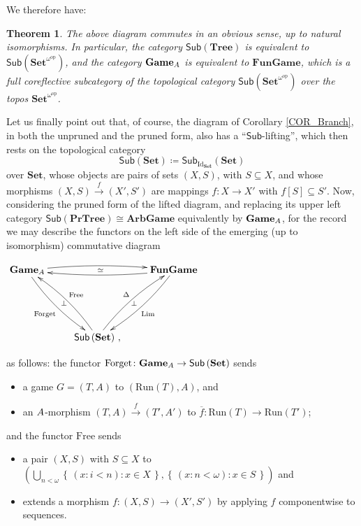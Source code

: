 \documentclass[12pt]{amsart}
\newtheorem{thm}{Theorem}[section]
\theoremstyle{definition}
\newcommand{\set}[1]{\left\{\, {#1} \,\right\}}
\newcommand{\seq}[1]{{\left( {#1} \right)}}
\newcommand{\A}{\textup{\textmd{\textsc{A}}}}
\newcommand{\Run}{{\mathrm{Run}}}
\newcommand{\Sets}{\mathbf{Set}}
\newcommand{\Tree}{\mathbf{Tree}}
\newcommand{\PrTree}{\mathbf{PrTree}}
\newcommand{\Games}{\mathbf{Game}}
\newcommand{\FunGame}{\mathbf{FunGame}}
\newcommand{\SetNop}{\Sets^{\omega^{\op}}}
\newcommand{\Sub}[1]{\mathsf{Sub}\left({#1}\right)}
\newcommand{\op}{\mathrm{op}}
\begin{document}
We therefore have:

\begin{thm}\label{THM_IsoSubSetsNop}
	The above diagram commutes in an obvious sense, up to natural isomorphisms. In particular, the category $\Sub{\Tree}$ is equivalent to $\Sub{\SetNop}$, and the category $\Games_\A$ is equivalent to $\mathbf{FunGame}$, which is a full coreflective subcategory of the topological category $\Sub{\SetNop}$ over the topos $\SetNop$.
\end{thm}


Let us finally point out that, of course, the diagram of Corollary \ref{COR_Branch}, in both the unpruned and the pruned form, also has a ``$\mathsf{Sub}$-lifting'', which then rests on the topological category
$$\Sub{\Sets} \coloneqq \mathsf{Sub}_{\mathrm{Id_{\Sets}}}(\Sets)$$
over $\Sets$, whose objects are pairs of sets $(X,S)$, with $S\subseteq X$, and whose morphisms $(X,S) \stackrel{f}{\to}(X',S')$ are mappings $f\colon X\to X'$ with $f[S]\subseteq S'$.
Now, 
considering the pruned form of the lifted diagram, and replacing its upper left category $\Sub{\PrTree}\cong\mathbf{ArbGame}$ equivalently by $\Games_\A$, for the record we may describe the  functors on the left side of the emerging (up to isomorphism) commutative diagram
\begin{center}
	$\xymatrix{\Games_\A\ar@/^0.4pc/[rr]^{\mathrm{}}_{\simeq}\ar@/_0.5pc/[ddr]_{\mathrm{Forget}}^{\bot} && \FunGame\ar@/^0.4pc/[ll]^{\mathrm{}}\ar@/^0.5pc/[ldd]^{\mathrm{Lim}}_{\bot}\\
		&&\\
		&\Sub{\Sets}\,,\ar@/_0.5pc/[luu]_{\mathrm{Free}}\ar@/^0.5pc/[uur]^{\Delta}&\\
	}$
\end{center}
as follows: the functor
$\mathrm{Forget}\colon\Games_\A\to\Sub{\Sets}$ sends

\begin{itemize}
	\item  a game $G=(T,A)$ to $(\Run(T),A)$, and
	\item an $\A$-morphism $(T,A)\stackrel{f}{\to} (T',A')$ to $\overline{f}\colon\Run(T)\to\Run(T')$;
\end{itemize}	
and the functor $\mathrm{Free}$ sends
\begin{itemize}
	\item a pair $(X,S)$ with $S\subseteq X$ to $( \bigcup_{n<\omega}\set{\seq{x: i<n}: x\in X}, \set{\seq{x: n<\omega}: x\in S})$ and \\
	\item extends a  morphism $f:(X,S)\to (X',S')$ by applying $f$ componentwise to sequences.
\end{itemize}
\end{document}
